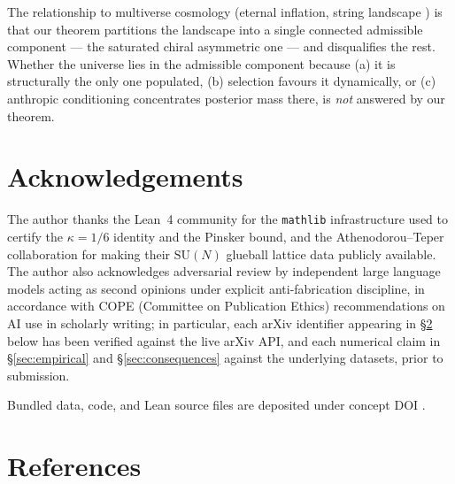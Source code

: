 \documentclass[11pt,reqno]{amsart}
\theoremstyle{plain}
\theoremstyle{definition}
\theoremstyle{remark}
\begin{document}
The relationship to multiverse cosmology (eternal inflation, string landscape \cite{Douglas2003, Bousso2000}) is that our theorem partitions the landscape into a single connected admissible component --- the saturated chiral asymmetric one --- and disqualifies the rest. Whether the universe lies in the admissible component because (a) it is structurally the only one populated, (b) selection favours it dynamically, or (c) anthropic conditioning concentrates posterior mass there, is \emph{not} answered by our theorem.

\section{Acknowledgements}
\label{sec:ack}

The author thanks the Lean~4 community for the \texttt{mathlib} infrastructure used to certify the $\kappa = 1/6$ identity and the Pinsker bound, and the Athenodorou--Teper collaboration for making their $\mathrm{SU}(N)$ glueball lattice data publicly available. The author also acknowledges adversarial review by independent large language models acting as second opinions under explicit anti-fabrication discipline, in accordance with COPE (Committee on Publication Ethics) recommendations on AI use in scholarly writing; in particular, each arXiv identifier appearing in \S\ref{sec:bib} below has been verified against the live arXiv API, and each numerical claim in \S\ref{sec:empirical} and \S\ref{sec:consequences} against the underlying datasets, prior to submission.

Bundled data, code, and Lean source files are deposited under concept DOI \cite{ZenodoConcept}.

\section{References}
\label{sec:bib}
\end{document}
